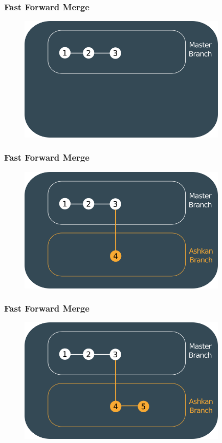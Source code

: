 \documentclass{beamer}
\begin{document}
	\begin{frame}
		\frametitle{Fast Forward Merge}
		\begin{figure}[htbp]
			\centering
			\includegraphics[width=10cm]{howgitwork11}
		\end{figure}
	\end{frame}
	
	\begin{frame}
		\frametitle{Fast Forward Merge}
		\begin{figure}[htbp]
			\centering
			\includegraphics[width=10cm]{howgitwork12}
		\end{figure}
	\end{frame}
	
	\begin{frame}
		\frametitle{Fast Forward Merge}
		\begin{figure}[htbp]
			\centering
			\includegraphics[width=10cm]{howgitwork13}
		\end{figure}
	\end{frame}
	
\end{document}
